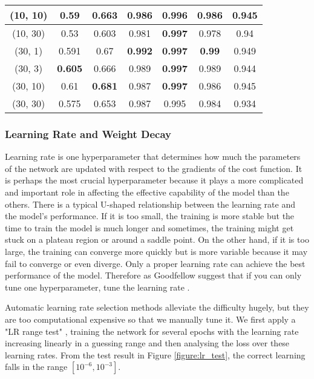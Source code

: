 \begin{table}[]
{\begin{tabular}{|c|c|c|c|c|c|c|}
			(10, 10) & 0.59 & 0.663 & 0.986 & 0.996 & 0.986 & 0.945 \\ \hline
			(10, 30) & 0.53 & 0.603 & 0.981 & \textbf{0.997} & 0.978 & 0.94 \\ \hline
			(30, 1) & 0.591 & 0.67 & \textbf{0.992} & \textbf{0.997} & \textbf{0.99} & 0.949 \\ \hline
			(30, 3) & \textbf{0.605} & 0.666 & 0.989 & \textbf{0.997} & 0.989 & 0.944 \\ \hline
			(30, 10) & 0.61 & \textbf{0.681} & 0.987 & \textbf{0.997} & 0.986 & 0.945 \\ \hline
			(30, 30) & 0.575 & 0.653 & 0.987 & 0.995 & 0.984 & 0.934 \\ \hline
		\end{tabular}%
	}
\end{table}


\subsubsection{Learning Rate and Weight Decay}

Learning rate is one hyperparameter that determines how much the parameters of the network are updated with respect to the gradients of the cost function. It is perhaps the most crucial hyperparameter because it plays a more complicated and important role in affecting the effective capability of the model than the others. There is a typical U-shaped relationship between the learning rate and the model's performance. If it is too small, the training is more stable but the time to train the model is much longer and sometimes, the training might get stuck on a plateau region or around a saddle point. On the other hand, if it is too large, the training can converge more quickly but is more variable because it may fail to converge or even diverge. Only a proper learning rate can achieve the best performance of the model. Therefore as Goodfellow \etal suggest that if you can only tune one hyperparameter, tune the learning rate \cite{Goodfellow-et-al-2016}.

Automatic learning rate selection methods alleviate the difficulty hugely, but they are too computational expensive so that we manually tune it. We first apply a "LR range test" \cite{DBLP:journals/corr/Smith15a}, training the network for several epochs with the learning rate increasing linearly in a guessing range and then analysing the loss over these learning rates. From the test result in Figure \ref{figure:lr_test}, the correct learning falls in the range $[10^{-6}, 10^{-3}]$. 

